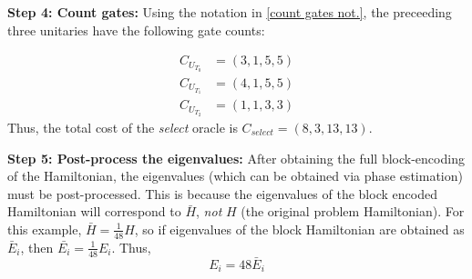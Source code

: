 \textbf{Step 4: Count gates:} Using the notation in \ref{count gates not.}, the preceeding three unitaries have the following gate counts:

\begin{align}
    C_{U_{T_0}} &= (3, 1, 5, 5)\\
    C_{U_{T_1}} &= (4, 1, 5, 5)\\
    C_{U_{T_2}} &= (1, 1, 3, 3)
\end{align}
Thus, the total cost of the \textit{select} oracle is $C_{\textit{select}} = (8, 3, 13, 13)$. 

\textbf{Step 5: Post-process the eigenvalues:} After obtaining the full block-encoding of the Hamiltonian, the eigenvalues (which can be obtained via phase estimation) must be post-processed. This is because the eigenvalues of the block encoded Hamiltonian will correspond to $\bar{H}$, \textit{not} $H$ (the original problem Hamiltonian).
For this example, $\bar{H} = \frac{1}{48}H$, so if eigenvalues of the block Hamiltonian are obtained as $\bar{E}_i$, then $\bar{E_i} = \frac{1}{48}E_i$. Thus,
\begin{equation}
    E_i = 48\bar{E}_i
\end{equation}